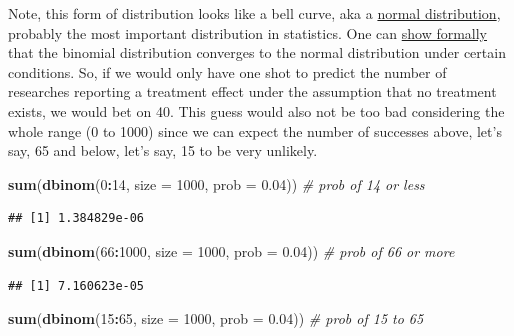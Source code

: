 \documentclass[
]{book}
\newenvironment{Shaded}{\begin{snugshade}}{\end{snugshade}}
\newcommand{\AttributeTok}[1]{\textcolor[rgb]{0.13,0.29,0.53}{#1}}
\newcommand{\CommentTok}[1]{\textcolor[rgb]{0.56,0.35,0.01}{\textit{#1}}}
\newcommand{\DecValTok}[1]{\textcolor[rgb]{0.00,0.00,0.81}{#1}}
\newcommand{\FloatTok}[1]{\textcolor[rgb]{0.00,0.00,0.81}{#1}}
\newcommand{\FunctionTok}[1]{\textcolor[rgb]{0.13,0.29,0.53}{\textbf{#1}}}
\newcommand{\NormalTok}[1]{#1}
\newcommand{\SpecialCharTok}[1]{\textcolor[rgb]{0.81,0.36,0.00}{\textbf{#1}}}
\begin{document}
Note, this form of distribution looks like a bell curve, aka a \href{https://en.wikipedia.org/wiki/Normal_distribution}{normal distribution},
probably the most important distribution in statistics. One can \href{https://www.m-hikari.com/imf/imf-2017/9-12-2017/p/baguiIMF9-12-2017.pdf}{show formally} that the binomial distribution converges to the normal distribution under certain conditions.
So, if we would only have one shot to predict the number of researches reporting a treatment effect under the assumption that no treatment exists, we would bet on 40.
This guess would also not be too bad considering the whole range (0 to 1000) since we can expect the number of successes above, let's say, 65 and below, let's say, 15 to be very unlikely.

\begin{Shaded}
\begin{Highlighting}[]
\FunctionTok{sum}\NormalTok{(}\FunctionTok{dbinom}\NormalTok{(}\DecValTok{0}\SpecialCharTok{:}\DecValTok{14}\NormalTok{, }\AttributeTok{size =} \DecValTok{1000}\NormalTok{, }\AttributeTok{prob =} \FloatTok{0.04}\NormalTok{)) }\CommentTok{\# prob of 14 or less}
\end{Highlighting}
\end{Shaded}

\begin{verbatim}
## [1] 1.384829e-06
\end{verbatim}

\begin{Shaded}
\begin{Highlighting}[]
\FunctionTok{sum}\NormalTok{(}\FunctionTok{dbinom}\NormalTok{(}\DecValTok{66}\SpecialCharTok{:}\DecValTok{1000}\NormalTok{, }\AttributeTok{size =} \DecValTok{1000}\NormalTok{, }\AttributeTok{prob =} \FloatTok{0.04}\NormalTok{)) }\CommentTok{\# prob of 66 or more}
\end{Highlighting}
\end{Shaded}

\begin{verbatim}
## [1] 7.160623e-05
\end{verbatim}

\begin{Shaded}
\begin{Highlighting}[]
\FunctionTok{sum}\NormalTok{(}\FunctionTok{dbinom}\NormalTok{(}\DecValTok{15}\SpecialCharTok{:}\DecValTok{65}\NormalTok{, }\AttributeTok{size =} \DecValTok{1000}\NormalTok{, }\AttributeTok{prob =} \FloatTok{0.04}\NormalTok{)) }\CommentTok{\# prob of 15 to 65}
\end{Highlighting}
\end{Shaded}
\end{document}
